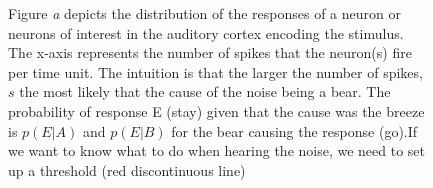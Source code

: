 \documentclass[11pt, onecolumn]{article}
\begin{document}
\begin{figure}[H]
    \hfill
    \caption{Figure \emph{a} depicts the distribution of the responses of a neuron or neurons of interest in the auditory cortex encoding the stimulus. The x-axis represents the number of spikes that the neuron(s) fire per time unit. The intuition is that the larger the number of spikes, $s$ the most likely that the cause of the noise being a bear. The probability of response E (stay) given that the cause was the breeze is $p(E|A)$ and  $p(E|B)$ for the bear causing the response (go).If we want to know what to do when hearing the noise, we need to set up a threshold (red discontinuous line) }
    \label{fig:lkhratio}
\end{figure}
\end{document}
